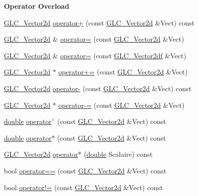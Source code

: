 \begin{Indent}{\bf Operator Overload}\par
\begin{DoxyCompactItemize}
\item 
\hyperlink{class_g_l_c___vector2d}{G\-L\-C\-\_\-\-Vector2d} \hyperlink{class_g_l_c___vector2d_a7d87e7206cfbfd40a406fbb447b97d16}{operator+} (const \hyperlink{class_g_l_c___vector2d}{G\-L\-C\-\_\-\-Vector2d} \&Vect) const 
\item 
\hyperlink{class_g_l_c___vector2d}{G\-L\-C\-\_\-\-Vector2d} \& \hyperlink{class_g_l_c___vector2d_a255bf641242f11d3e214d3b1ba1bd166}{operator=} (const \hyperlink{class_g_l_c___vector2d}{G\-L\-C\-\_\-\-Vector2d} \&Vect)
\item 
\hyperlink{class_g_l_c___vector2d}{G\-L\-C\-\_\-\-Vector2d} \& \hyperlink{class_g_l_c___vector2d_a5508d89bc524b83dcbb8d6e90e98f5e7}{operator=} (const \hyperlink{class_g_l_c___vector2df}{G\-L\-C\-\_\-\-Vector2df} \&Vect)
\item 
\hyperlink{class_g_l_c___vector2d}{G\-L\-C\-\_\-\-Vector2d} $\ast$ \hyperlink{class_g_l_c___vector2d_a9c55ce1b990f576fa38fad774b27afb2}{operator+=} (const \hyperlink{class_g_l_c___vector2d}{G\-L\-C\-\_\-\-Vector2d} \&Vect)
\item 
\hyperlink{class_g_l_c___vector2d}{G\-L\-C\-\_\-\-Vector2d} \hyperlink{class_g_l_c___vector2d_a163fb7e807bdfef40c0a43dc41b88a80}{operator-\/} (const \hyperlink{class_g_l_c___vector2d}{G\-L\-C\-\_\-\-Vector2d} \&Vect) const 
\item 
\hyperlink{class_g_l_c___vector2d}{G\-L\-C\-\_\-\-Vector2d} $\ast$ \hyperlink{class_g_l_c___vector2d_afb692a8eb899d7915171ef37c794b768}{operator-\/=} (const \hyperlink{class_g_l_c___vector2d}{G\-L\-C\-\_\-\-Vector2d} \&Vect)
\item 
\hyperlink{_super_l_u_support_8h_a8956b2b9f49bf918deed98379d159ca7}{double} \hyperlink{class_g_l_c___vector2d_ad4353d0ca9175817b4f1c4417974a916}{operator$^\wedge$} (const \hyperlink{class_g_l_c___vector2d}{G\-L\-C\-\_\-\-Vector2d} \&Vect) const 
\item 
\hyperlink{_super_l_u_support_8h_a8956b2b9f49bf918deed98379d159ca7}{double} \hyperlink{class_g_l_c___vector2d_a4463915c1993b03ac6370e3277145f1f}{operator$\ast$} (const \hyperlink{class_g_l_c___vector2d}{G\-L\-C\-\_\-\-Vector2d} \&Vect) const 
\item 
\hyperlink{class_g_l_c___vector2d}{G\-L\-C\-\_\-\-Vector2d} \hyperlink{class_g_l_c___vector2d_ac5da0fea1919aa361e0215887a17ed7f}{operator$\ast$} (\hyperlink{_super_l_u_support_8h_a8956b2b9f49bf918deed98379d159ca7}{double} Scalaire) const 
\item 
bool \hyperlink{class_g_l_c___vector2d_a7008c6e431c48a6d5f6b2b6928a670c1}{operator==} (const \hyperlink{class_g_l_c___vector2d}{G\-L\-C\-\_\-\-Vector2d} \&Vect) const 
\item 
bool \hyperlink{class_g_l_c___vector2d_a83a319b996944b2bb16eb23c19a4b0af}{operator!=} (const \hyperlink{class_g_l_c___vector2d}{G\-L\-C\-\_\-\-Vector2d} \&Vect) const 
\end{DoxyCompactItemize}
\end{Indent}
